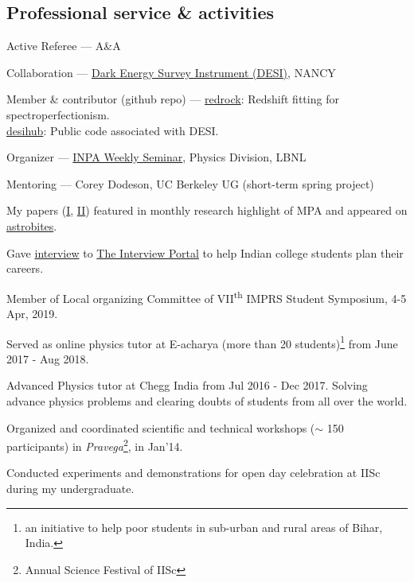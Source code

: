 \documentclass[12pt,letterpaper]{article}
\begin{document}

\subsection{Professional service \& activities}
\begin{list}{}{\cvlist}
    \item Active Referee ---
        A\&A
    \item Collaboration ---
        \href{https://www.desi.lbl.gov/}{Dark Energy Survey Instrument (DESI)}, NANCY
    \item Member \& contributor (github repo) ---
        \hspace{6mm}\href{https://github.com/desihub/redrock}{redrock}: Redshift fitting for spectroperfectionism.\\
        \hspace{6mm}\href{https://github.com/desihub}{desihub}: Public code associated with DESI.
     
    \item Organizer ---
        \href{https://inpa.lbl.gov/events/}{INPA Weekly Seminar}, Physics Division, LBNL
    \item Mentoring ---
        Corey Dodeson, UC Berkeley UG (short-term spring project)
    \item My papers (\href{https://www.mpa-garching.mpg.de/964620/hl202107}{I}, \href{https://www.mpa-garching.mpg.de/1066558/hl202211?c=27981}{II}) featured in monthly research highlight of MPA and appeared on \href{https://astrobites.org/2021/05/06/cool-metal-gas-search-thanks-it-was-automated/}{astrobites}.
    \item Gave \href{https://theinterviewportal.com/2020/03/13/astrophysicist-interview-8/}{interview} to \href{https://theinterviewportal.com/}{The Interview Portal} to help Indian college students plan their careers. 
    \item Member of Local organizing Committee of VII\textsuperscript{th} IMPRS Student Symposium, 4-5 Apr, 2019.
  \item Served as online physics tutor at E-acharya (more than 20 students)\footnote{an initiative to help poor students in sub-urban and rural areas of Bihar, India.} from June 2017 - Aug 2018.
    \item Advanced Physics tutor at Chegg India from Jul 2016 - Dec 2017. Solving advance physics problems and clearing doubts of students from all over the world.
  \item Organized and coordinated scientific and technical workshops ($\sim$ 150 participants) in \emph{Pravega}\footnote{Annual Science Festival of IISc}, in Jan'14.
    \item Conducted experiments and demonstrations for open day celebration at IISc during my undergraduate.
\end{list}
\end{document}
